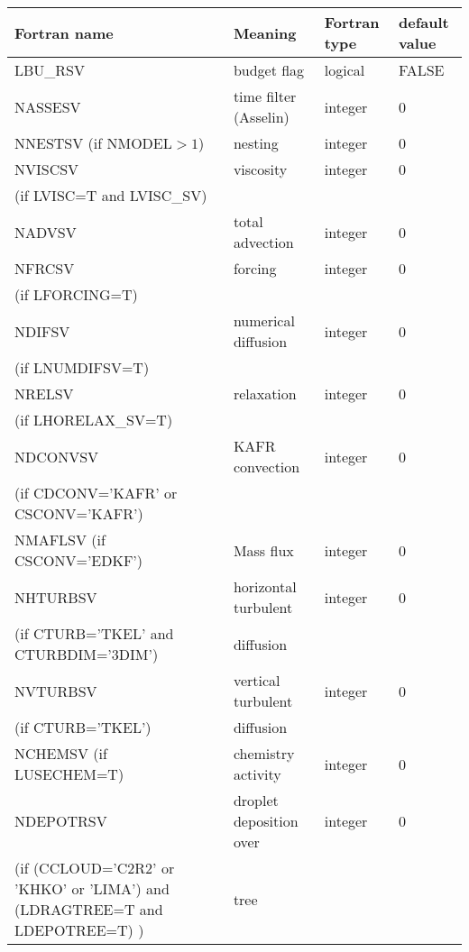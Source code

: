 \begin{longtable} {|p{}|p{}|>{\centering}p{}|p{}<{\centering}|}
\hline
Fortran name & Meaning & Fortran type & default value \\
\hline \hline
\endhead
LBU\_RSV & budget flag & logical & FALSE\index{LBU\_RSV!\innam{NAM\_BU\_RSV}}\\\hline
NASSESV  & time filter (Asselin)   & integer  &  0 \index{NASSESV!\innam{NAM\_BU\_RSV}} \\\hline
NNESTSV (if NMODEL$>1$) & nesting       & integer  &  0 \index{NNESTSV!\innam{NAM\_BU\_RSV}} \\\hline
NVISCSV  & viscosity         & integer  &  0 \index{NVISCSV!\innam{NAM\_BU\_RSV}}\\
(if LVISC=T and LVISC\_SV) &  &   &   \\\hline
NADVSV   & total advection   & integer  &  0 \index{NADVSV!\innam{NAM\_BU\_RSV}}\\\hline
NFRCSV   & forcing           & integer  &  0 \index{NFRCSV!\innam{NAM\_BU\_RSV}} \\ \nopagebreak
(if LFORCING=T) &  &   &   \\\hline
NDIFSV   & numerical diffusion & integer &  0 \index{NDIFSV!\innam{NAM\_BU\_RSV}}\\ \nopagebreak
(if LNUMDIFSV=T) &  &   &   \\\hline
NRELSV   & relaxation        & integer  &  0 \index{NRELSV!\innam{NAM\_BU\_RSV}}\\ \nopagebreak
(if LHORELAX\_SV=T) &  &   &   \\\hline
NDCONVSV & KAFR convection   & integer  &  0 \index{NDCONVSV!\innam{NAM\_BU\_RSV}} \\ \nopagebreak
(if CDCONV='KAFR' or CSCONV='KAFR') &  &   &   \\\hline
NMAFLSV (if CSCONV='EDKF') & Mass flux & integer  &  0 \index{NMAFLSV!\innam{NAM\_BU\_RSV}} \\\hline
NHTURBSV & horizontal turbulent  & integer  &  0 \index{NHTURBSV!\innam{NAM\_BU\_RSV}} \\ \nopagebreak
(if CTURB='TKEL' and CTURBDIM='3DIM') &diffusion &   &  \\\hline
NVTURBSV & vertical turbulent  & integer  &  0 \index{NVTURBSV!\innam{NAM\_BU\_RSV}}\\ \nopagebreak
(if CTURB='TKEL') &diffusion &   &  \\\hline
NCHEMSV (if LUSECHEM=T) & chemistry activity & integer  &  0 \index{NCHEMSV!\innam{NAM\_BU\_RSV}} \\\hline
NDEPOTRSV  & droplet deposition over    & integer  &  0 \index{NDEPOTRSV!\innam{NAM\_BU\_RSV}}\\ \nopagebreak
(if (CCLOUD='C2R2' or 'KHKO' or 'LIMA') and (LDRAGTREE=T and LDEPOTREE=T)  ) & tree &   &   \\\hline
\end{longtable}

